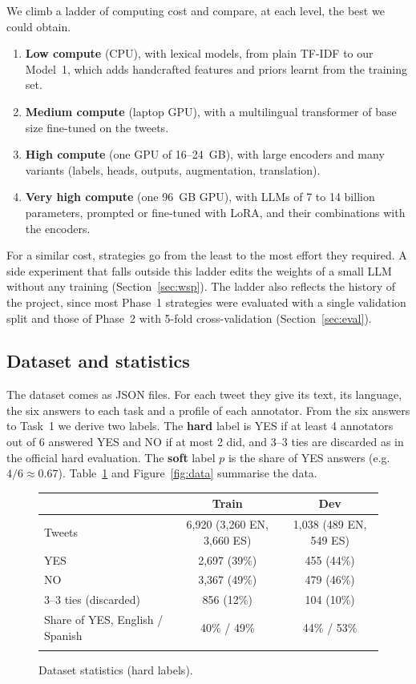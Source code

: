\documentclass[pdflatex,sn-mathphys-num]{sn-jnl}
\makeatletter
\newenvironment{Htable}{\begin{figure}[H]\def\@captype{table}\begin{center}\begin{threeparttable}\tablebodyfont}{\end{threeparttable}\end{center}\end{figure}}
\makeatother
\begin{document}
We climb a ladder of computing cost and compare, at each level, the best we could obtain.
\begin{enumerate}
\item \textbf{Low compute} (CPU), with lexical models, from plain TF-IDF to our Model~1, which adds handcrafted features and priors learnt from the training set.
\item \textbf{Medium compute} (laptop GPU), with a multilingual transformer of base size fine-tuned on the tweets.
\item \textbf{High compute} (one GPU of 16--24~GB), with large encoders and many variants (labels, heads, outputs, augmentation, translation).
\item \textbf{Very high compute} (one 96~GB GPU), with LLMs of 7 to 14 billion parameters, prompted or fine-tuned with LoRA, and their combinations with the encoders.
\end{enumerate}
For a similar cost, strategies go from the least to the most effort they required. A side experiment that falls outside this ladder edits the weights of a small LLM without any training (Section~\ref{sec:wsp}). The ladder also reflects the history of the project, since most Phase~1 strategies were evaluated with a single validation split and those of Phase~2 with 5-fold cross-validation (Section~\ref{sec:eval}).

\subsection{Dataset and statistics}

The dataset comes as JSON files. For each tweet they give its text, its language, the six answers to each task and a profile of each annotator. From the six answers to Task~1 we derive two labels. The \textbf{hard} label is YES if at least 4 annotators out of 6 answered YES and NO if at most 2 did, and 3--3 ties are discarded as in the official hard evaluation. The \textbf{soft} label $p$ is the share of YES answers (e.g.\ $4/6 \approx 0.67$). Table~\ref{tab:data} and Figure~\ref{fig:data} summarise the data.

\begin{Htable}
\caption{Dataset statistics (hard labels).}\label{tab:data}
\begin{tabular}{@{}lcc@{}}
\toprule
 & Train & Dev \\
\midrule
Tweets & 6,920 (3,260 EN, 3,660 ES) & 1,038 (489 EN, 549 ES) \\
YES & 2,697 (39\%) & 455 (44\%) \\
NO & 3,367 (49\%) & 479 (46\%) \\
3--3 ties (discarded) & 856 (12\%) & 104 (10\%) \\
Share of YES, English / Spanish & 40\% / 49\% & 44\% / 53\% \\
\botrule
\end{tabular}
\end{Htable}
\end{document}
